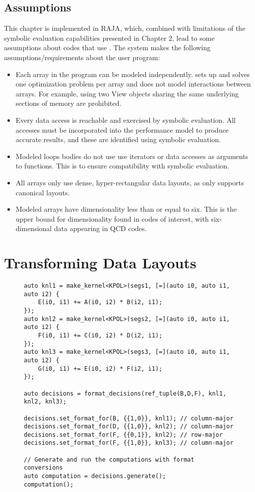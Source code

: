 \subsection{Assumptions}
This chapter is implemented in RAJA, which, combined with limitations of the symbolic evaluation capabilities presented in Chapter 2, lead to some assumptions about codes that use \FormatDecisions{}.
The \FormatDecisions{} system makes the following assumptions/requirements about the user program:
\begin{itemize}
\item Each array in the program can be modeled independently. \FormatDecisions{} sets up and solves one optimization problem per array and does not model interactions between arrays. For example, using two View objects sharing the same underlying sections of memory are prohibited.
\item Every data access is reachable and exercised by symbolic evaluation. All accesses must be incorporated into the performance model to produce accurate results, and these are identified using symbolic evaluation.
\item Modeled loops bodies do not use use iterators or data accesses as arguments to functions. This is to ensure compatibility with symbolic evaluation.
\item All arrays only use dense, hyper-rectangular data layouts, as \FormatDecisions{} only supports canonical layouts.
\item Modeled arrays have dimensionality less than or equal to six. This is the upper bound for dimensionality found in codes of interest, with six-dimensional data appearing in QCD codes.
\end{itemize}


\section{Transforming Data Layouts}

\begin{figure}
\begin{lstlisting}[caption={Changing data layouts for three Views in the \textsc{3mm} benchmark using \FormatDecisions.},
	label={FormatDecisions3MM}]
auto knl1 = make_kernel<KPOL>(segs1, [=](auto i0, auto i1, auto i2) {
	E(i0, i1) += A(i0, i2) * B(i2, i1);
});
auto knl2 = make_kernel<KPOL>(segs2, [=](auto i0, auto i1, auto i2) {
	F(i0, i1) += C(i0, i2) * D(i2, i1);
});
auto knl3 = make_kernel<KPOL>(segs3, [=](auto i0, auto i1, auto i2) {
	G(i0, i1) += E(i0, i2) * F(i2, i1);
});

auto decisions = format_decisions(ref_tuple(B,D,F), knl1, knl2, knl3);

decisions.set_format_for(B, {{1,0}}, knl1); // column-major
decisions.set_format_for(D, {{1,0}}, knl2); // column-major
decisions.set_format_for(F, {{0,1}}, knl2); // row-major
decisions.set_format_for(F, {{1,0}}, knl3); // column-major

// Generate and run the computations with format conversions
auto computation = decisions.generate();
computation();
\end{lstlisting}
\end{figure}

